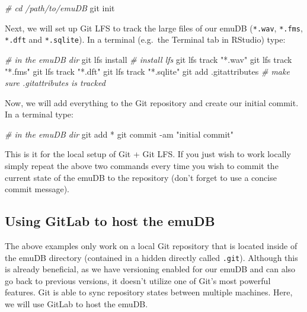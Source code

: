 \documentclass[]{book}
\newenvironment{Shaded}{\begin{snugshade}}{\end{snugshade}}
\newcommand{\CommentTok}[1]{\textcolor[rgb]{0.56,0.35,0.01}{\textit{#1}}}
\newcommand{\FunctionTok}[1]{\textcolor[rgb]{0.00,0.00,0.00}{#1}}
\newcommand{\NormalTok}[1]{#1}
\newcommand{\StringTok}[1]{\textcolor[rgb]{0.31,0.60,0.02}{#1}}
\begin{document}
\begin{Shaded}
\begin{Highlighting}[]
\CommentTok{# cd /path/to/emuDB}
\FunctionTok{git}\NormalTok{ init}
\end{Highlighting}
\end{Shaded}

Next, we will set up Git LFS to track the large files of our emuDB (\texttt{*.wav}, \texttt{*.fms}, \texttt{*.dft} and \texttt{*.sqlite}). In a terminal (e.g.~the Terminal tab in RStudio) type:

\begin{Shaded}
\begin{Highlighting}[]
\CommentTok{# in the emuDB dir}
\FunctionTok{git}\NormalTok{ lfs install }\CommentTok{# install lfs }
\FunctionTok{git}\NormalTok{ lfs track }\StringTok{"*.wav"}
\FunctionTok{git}\NormalTok{ lfs track }\StringTok{"*.fms"}
\FunctionTok{git}\NormalTok{ lfs track }\StringTok{"*.dft"}
\FunctionTok{git}\NormalTok{ lfs track }\StringTok{"*.sqlite"}
\FunctionTok{git}\NormalTok{ add .gitattributes }\CommentTok{# make sure .gitattributes is tracked}
\end{Highlighting}
\end{Shaded}

Now, we will add everything to the Git repository and create our initial commit. In a terminal type:

\begin{Shaded}
\begin{Highlighting}[]
\CommentTok{# in the emuDB dir}
\FunctionTok{git}\NormalTok{ add *}
\FunctionTok{git}\NormalTok{ commit -am }\StringTok{"initial commit"}
\end{Highlighting}
\end{Shaded}

This is it for the local setup of Git + Git LFS. If you just wish to work locally simply repeat the above two commands every time you wish to commit the current state of the emuDB to the repository (don't forget to use a concise commit message).

\hypertarget{using-gitlab-to-host-the-emudb}{%
\subsection{Using GitLab to host the emuDB}\label{using-gitlab-to-host-the-emudb}}

The above examples only work on a local Git repository that is located inside of the emuDB directory (contained in a hidden directly called \texttt{.git}). Although this is already beneficial, as we have versioning enabled for our emuDB and can also go back to previous versions, it doesn't utilize one of Git's most powerful features. Git is able to sync repository states between multiple machines. Here, we will use GitLab to host the emuDB.
\end{document}
